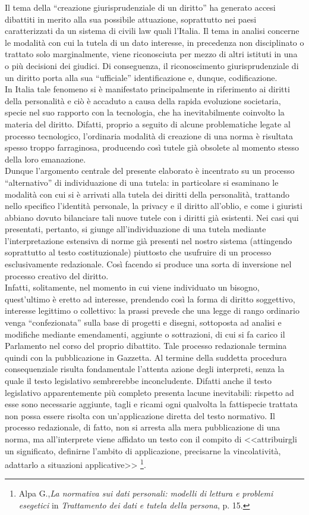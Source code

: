 Il tema della “creazione giurisprudenziale di un diritto” ha generato accesi dibattiti in merito alla sua possibile attuazione, soprattutto nei paesi caratterizzati da un sistema di civili law quali l’Italia. 
Il tema in analisi concerne le modalità con cui la tutela di un dato interesse, in precedenza non disciplinato o trattato solo marginalmente, viene riconosciuta per mezzo di altri istituti in una o più decisioni dei giudici.
Di conseguenza, il riconoscimento giurisprudenziale di un diritto porta alla sua “ufficiale” identificazione e, dunque, codificazione.
\\In Italia tale fenomeno si è manifestato principalmente in riferimento ai diritti della personalità e ciò è accaduto a causa della rapida evoluzione societaria, specie nel suo rapporto con la tecnologia, che ha inevitabilmente coinvolto la materia del diritto.
Difatti, proprio a seguito di alcune problematiche legate al processo tecnologico, l’ordinaria modalità di creazione di una norma è risultata spesso troppo farraginosa, producendo così tutele già obsolete al momento stesso della loro emanazione.
\\Dunque l’argomento centrale del presente elaborato è incentrato su un processo “alternativo” di individuazione di una tutela: in particolare si esaminano le modalità con cui si è arrivati alla tutela dei diritti della personalità, trattando nello specifico l’identità personale, la privacy e il diritto all’oblio, e come i giuristi abbiano dovuto bilanciare tali nuove tutele con i diritti già esistenti. 
Nei casi qui presentati, pertanto, si giunge all’individuazione di una tutela mediante l’interpretazione estensiva di norme già presenti nel nostro sistema (attingendo soprattutto al testo costituzionale) piuttosto che usufruire di un processo esclusivamente redazionale.
Così facendo si produce una sorta di inversione nel processo creativo del diritto. \\Infatti, solitamente, nel momento in cui viene individuato un bisogno, quest’ultimo è eretto ad interesse, prendendo così la forma di diritto soggettivo, interesse legittimo o collettivo: la prassi prevede che una legge di rango ordinario venga “confezionata” sulla base di progetti e disegni, sottoposta ad analisi e modifiche mediante emendamenti, aggiunte o sottrazioni, di cui si fa carico il Parlamento nel corso del proprio dibattito. Tale processo redazionale termina quindi 
con la pubblicazione in Gazzetta. Al termine della suddetta procedura consequenziale risulta fondamentale l’attenta azione degli interpreti, senza la quale il testo legislativo sembrerebbe inconcludente. Difatti anche il testo legislativo apparentemente più completo presenta lacune inevitabili: rispetto ad esse sono necessarie aggiunte, tagli e ricami ogni qualvolta la fattispecie trattata non possa essere risolta con un’applicazione diretta del testo normativo.  Il processo redazionale, di fatto, non si arresta alla mera pubblicazione di una norma, ma all’interprete viene affidato un testo con il compito di <<attribuirgli un significato, definirne l’ambito di applicazione, precisarne la vincolatività, adattarlo a situazioni applicative>> \footnote{Alpa G.,\textit{La normativa sui dati personali: modelli di lettura e problemi esegetici} in \textit{Trattamento dei dati e tutela della persona}, p. 15.}.
